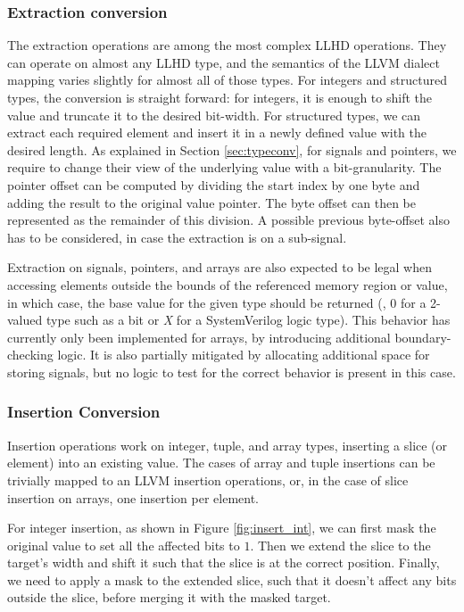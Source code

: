 \subsubsection{Extraction conversion}
\label{sec:extrs}
The extraction operations are among the most complex LLHD operations. They can operate on almost any LLHD type, and the semantics of the LLVM dialect mapping varies slightly for almost all of those types. For integers and structured types, the conversion is straight forward: for integers, it is enough to shift the value and truncate it to the desired bit-width.
For structured types, we can extract each required element and insert it in a newly defined value with the desired length. As explained in Section \ref{sec:typeconv}, for signals and pointers, we require to change their view of the underlying value with a bit-granularity. The pointer offset can be computed by dividing the start index by one byte and adding the result to the original value pointer. The byte offset can then be represented as the remainder of this division. A possible previous byte-offset also has to be considered, in case the extraction is on a sub-signal.

Extraction on signals, pointers, and arrays are also expected to be legal when accessing elements outside the bounds of the referenced memory region or value, in which case, the base value for the given type should be returned (\ie, $0$ for a 2-valued type such as a bit or \textit{X} for a SystemVerilog logic type). This behavior has currently only been implemented for arrays, by introducing additional boundary-checking logic. It is also partially mitigated by allocating additional space for storing signals, but no logic to test for the correct behavior is present in this case.


\subsubsection{Insertion Conversion}
Insertion operations work on integer, tuple, and array types, inserting a slice (or element) into an existing value. The cases of array and tuple insertions can be trivially mapped to an LLVM insertion operations, or, in the case of slice insertion on arrays, one insertion per element.

For integer insertion, as shown in Figure \ref{fig:insert_int}, we can first mask the original value to set all the affected bits to $1$. Then we extend the slice to the target's width and shift it such that the slice is at the correct position. Finally, we need to apply a mask to the extended slice, such that it doesn't affect any bits outside the slice, before merging it with the masked target.

